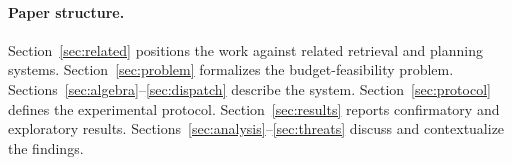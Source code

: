 \paragraph{Paper structure.}
Section~\ref{sec:related} positions the work against related retrieval and planning systems.
Section~\ref{sec:problem} formalizes the budget-feasibility problem.
Sections~\ref{sec:algebra}--\ref{sec:dispatch} describe the system.
Section~\ref{sec:protocol} defines the experimental protocol.
Section~\ref{sec:results} reports confirmatory and exploratory results.
Sections~\ref{sec:analysis}--\ref{sec:threats} discuss and contextualize the findings.
